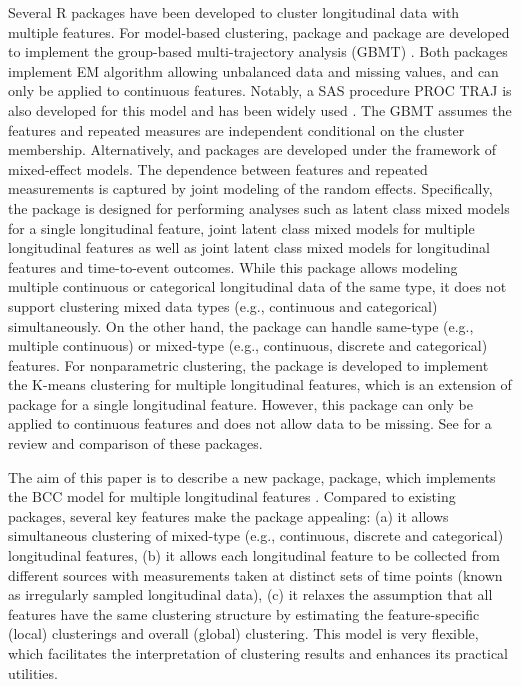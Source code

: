 Several R packages have been developed to cluster longitudinal data with multiple features. For model-based clustering,  package \citep{Magrini2022} and  package \citep{Leisch2004} are developed to implement the group-based multi-trajectory analysis (GBMT) \citep{Nagin2018, Magrini2022a}. Both packages implement EM algorithm allowing unbalanced data and missing values, and can only be applied to continuous features.  Notably, a SAS procedure PROC TRAJ  is also developed for this model and has been widely used \citep{Nagin2018}. The GBMT assumes the features and repeated measures are independent conditional on the cluster membership. Alternatively,  and  packages are developed under the framework of mixed-effect models. The dependence between features and repeated measurements is captured by joint modeling of the random effects.  Specifically,  the  package is designed for performing analyses such as latent class mixed models for a single longitudinal feature, joint latent class mixed models for multiple longitudinal features as well as joint latent class mixed models for longitudinal features and time-to-event outcomes. While this package allows modeling multiple continuous or categorical longitudinal data of the same type, it does not support clustering mixed data types (e.g., continuous and categorical)  simultaneously. On the other hand, the  package can handle same-type (e.g., multiple continuous) or mixed-type (e.g., continuous, discrete and categorical) features.  For nonparametric clustering, the  package \citep{Genolini2013} is developed to implement the K-means clustering for multiple longitudinal features, which is an extension of  package \citep{Genolini2010} for a single longitudinal feature. However, this package can only be applied to continuous features and does not allow data to be missing. See \citet{Lu2023} for a review and comparison of these packages. 

The aim of this paper is to describe a new package,  package, which implements the BCC model for multiple longitudinal features \citep{Lu2022,Tan2022a}. Compared to existing packages, several key features make the  package appealing: (a) it allows simultaneous clustering of mixed-type (e.g., continuous, discrete and categorical) longitudinal features, (b) it allows each longitudinal feature to be collected from different sources with measurements taken at distinct sets of time points (known as irregularly sampled longitudinal data), (c) it relaxes the assumption that all features have the same clustering structure by estimating the feature-specific (local) clusterings and overall (global) clustering. This model is very flexible, which facilitates the interpretation of clustering results and enhances its practical utilities. 

